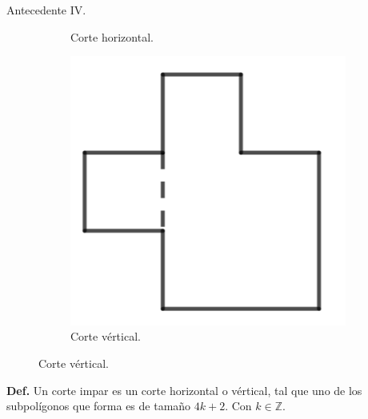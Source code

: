 \begin{frame}{Antecedente IV.}
\begin{figure}
\begin{subfigure}[b]{0.2\paperwidth}
      \caption*{Corte horizontal.}
    \end{subfigure}
    \begin{subfigure}[b]{0.2\paperwidth}
      \includegraphics[width=0.1\paperwidth]{./images/FigCV.png}
      \caption*{Corte vértical.}
    \end{subfigure}
  \end{figure}
  \textbf{Def.} Un corte impar es un corte horizontal o vértical, tal que uno de los subpolígonos
  que forma es de tamaño $4k + 2$. Con $k \in \mathbb{Z}$.
\end{frame}
